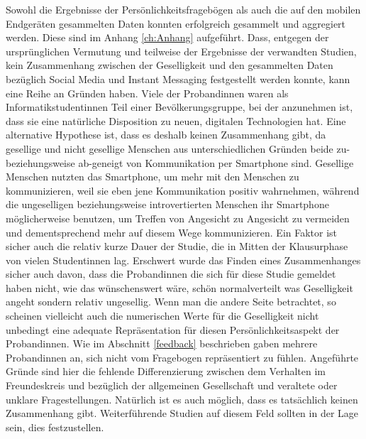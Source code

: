 Sowohl die Ergebnisse der Persönlichkeitsfragebögen als auch die auf den mobilen Endgeräten gesammelten Daten konnten erfolgreich gesammelt und aggregiert werden.
Diese sind im Anhang \ref{ch:Anhang} aufgeführt.
Dass, entgegen der ursprünglichen Vermutung und teilweise der Ergebnisse der verwandten Studien, kein Zusammenhang zwischen der Geselligkeit und den gesammelten Daten bezüglich Social Media und Instant Messaging festgestellt werden konnte, kann eine Reihe an Gründen haben.
Viele der Probandinnen waren als Informatikstudentinnen Teil einer Bevölkerungsgruppe, bei der anzunehmen ist, dass sie eine natürliche Disposition zu neuen, digitalen Technologien hat.
Eine alternative Hypothese ist, dass es deshalb keinen Zusammenhang gibt, da gesellige und nicht gesellige Menschen aus unterschiedlichen Gründen beide zu- beziehungsweise ab-geneigt von Kommunikation per Smartphone sind.
Gesellige Menschen nutzten das Smartphone, um mehr mit den Menschen zu kommunizieren, weil sie eben jene Kommunikation positiv wahrnehmen,
während die ungeselligen beziehungsweise introvertierten Menschen ihr Smartphone möglicherweise benutzen, um Treffen von Angesicht zu Angesicht zu vermeiden und dementsprechend mehr auf diesem Wege kommunizieren.
Ein Faktor ist sicher auch die relativ kurze Dauer der Studie, die in Mitten der Klausurphase von vielen Studentinnen lag.
Erschwert wurde das Finden eines Zusammenhanges sicher auch davon, dass die Probandinnen die sich für diese Studie gemeldet haben nicht, wie das wünschenswert wäre, schön normalverteilt was Geselligkeit angeht sondern relativ ungesellig.
Wenn man die andere Seite betrachtet, so scheinen vielleicht auch die numerischen Werte für die Geselligkeit nicht unbedingt eine adequate Repräsentation für diesen Persönlichkeitsaspekt der Probandinnen.
Wie im Abschnitt \ref{feedback} beschrieben gaben mehrere Probandinnen an, sich nicht vom Fragebogen repräsentiert zu fühlen.
Angeführte Gründe sind hier die fehlende Differenzierung zwischen dem Verhalten im Freundeskreis und bezüglich der allgemeinen Gesellschaft und veraltete oder unklare Fragestellungen.
Natürlich ist es auch möglich, dass es tatsächlich keinen Zusammenhang gibt.
Weiterführende Studien auf diesem Feld sollten in der Lage sein, dies festzustellen.

